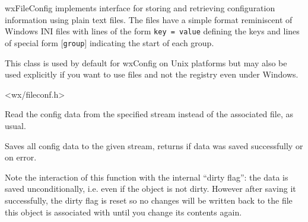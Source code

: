 
\section{}\label{wxfileconfig}

wxFileConfig implements  interface for
storing and retrieving configuration information using plain text files. The
files have a simple format reminiscent of Windows INI files with lines of the
form \texttt{key = value} defining the keys and lines of special form
\texttt{$[$group$]$} indicating the start of each group.

This class is used by default for wxConfig on Unix platforms but may also be
used explicitly if you want to use files and not the registry even under
Windows.




<wx/fileconf.h>



\label{wxfileconfigctor}


Read the config data from the specified stream instead of the associated file,
as usual.




\label{wxfileconfigsave}


Saves all config data to the given stream, returns \true if data was saved
successfully or \false on error.

Note the interaction of this function with the internal ``dirty flag'': the
data is saved unconditionally, i.e. even if the object is not dirty. However
after saving it successfully, the dirty flag is reset so no changes will be
written back to the file this object is associated with until you change its
contents again.

